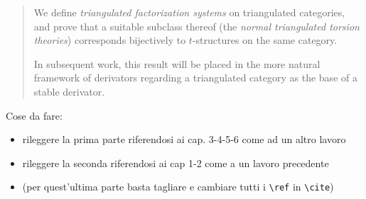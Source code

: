 \documentclass[a4paper,10pt]{amsart}
\begin{document}
\maketitle
\begin{abstract}
We define \emph{triangulated factorization systems} on triangulated categories, and prove that a suitable subclass thereof (the \emph{normal triangulated torsion theories}) corresponds bijectively to $t$-structures on the same category.

In subsequent work, this result will be placed in the more natural framework of derivators regarding a triangulated category as the base of a stable derivator.
\end{abstract}

{\color{red} Cose da fare:
\begin{itemize}
\item rileggere la prima parte riferendosi ai cap. 3-4-5-6 come ad un altro lavoro
\item rileggere la seconda riferendosi ai cap 1-2 come a un lavoro precedente
\item (per quest'ultima parte basta tagliare e cambiare tutti i \verb|\ref| in \verb|\cite|)
\end{itemize}
}

\tableofcontents



% 
% 
% 
% 



\end{document}
